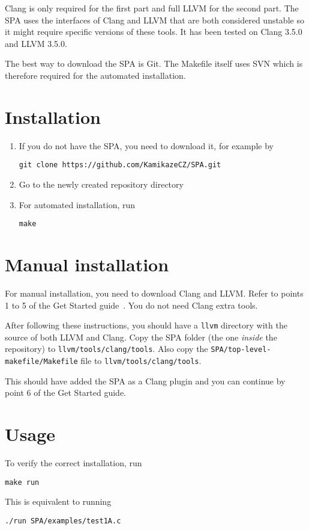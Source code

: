 Clang is only required for the first part and full LLVM for the second part. The SPA uses the interfaces of Clang and LLVM that are both considered unstable so it might require specific versions of these tools. It has been tested on Clang 3.5.0  and LLVM 3.5.0.

The best way to download the SPA is Git. The Makefile itself uses SVN which is therefore required for the automated installation.
\section{Installation}
\begin{enumerate}
\item If you do not have the SPA, you need to download it, for example by
\begin{verbatim}git clone https://github.com/KamikazeCZ/SPA.git\end{verbatim}

\item Go to the newly created repository directory

\item For automated installation, run
\begin{verbatim}make\end{verbatim}
\end{enumerate}
\section{Manual installation}
For manual installation, you need to download Clang and LLVM. Refer to points 1 to 5 of the Get Started guide~\cite{clang-get_started}. You do not need Clang extra tools.

After following these instructions, you should have a \verb|llvm| directory with the source of both LLVM and Clang. Copy the SPA folder (the one \emph{inside} the repository) to \verb|llvm/tools/clang/tools|. Also copy the \verb|SPA/top-level-makefile/Makefile| file to \verb|llvm/tools/clang/tools|.

This should have added the SPA as a Clang plugin and you can continue by point 6 of the Get Started guide.
\section{Usage}
To verify the correct installation, run \begin{verbatim}make run\end{verbatim} This is equivalent to running \begin{verbatim}./run SPA/examples/test1A.c\end{verbatim}

